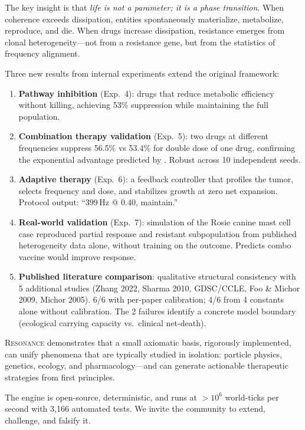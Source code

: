 \documentclass[11pt,a4paper]{article}
\begin{document}
The key insight is that \emph{life is not a parameter;
it is a phase transition}. When coherence exceeds
dissipation, entities spontaneously materialize, metabolize,
reproduce, and die. When drugs increase dissipation,
resistance emerges from clonal heterogeneity---not from
a resistance gene, but from the statistics of frequency
alignment.

Three new results from internal experiments extend the original framework:
\begin{enumerate}
  \item \textbf{Pathway inhibition} (Exp.~4): drugs that
        reduce metabolic efficiency without killing,
        achieving 53\% suppression while maintaining
        the full population.
  \item \textbf{Combination therapy validation} (Exp.~5):
        two drugs at different frequencies suppress
        56.5\% vs 53.4\% for double dose of one drug,
        confirming the exponential advantage predicted by
        \citet{bozic2013evolutionary}. Robust across
        10 independent seeds.
  \item \textbf{Adaptive therapy} (Exp.~6): a feedback
        controller that profiles the tumor, selects
        frequency and dose, and stabilizes growth at
        zero net expansion. Protocol output:
        ``399\,Hz @ 0.40, maintain.''
  \item \textbf{Real-world validation} (Exp.~7): simulation
        of the Rosie canine mast cell case reproduced
        partial response and resistant subpopulation from
        published heterogeneity data alone, without training
        on the outcome. Predicts combo vaccine would improve
        response.
  \item \textbf{Published literature comparison}: qualitative
        structural consistency with 5 additional studies
        (Zhang 2022, Sharma 2010, GDSC/CCLE, Foo \& Michor 2009,
        Michor 2005). 6/6 with per-paper calibration;
        4/6 from 4 constants alone without calibration.
        The 2 failures identify a concrete model boundary
        (ecological carrying capacity vs.\ clinical net-death).
\end{enumerate}

\textsc{Resonance} demonstrates that a small axiomatic
basis, rigorously implemented, can unify phenomena that
are typically studied in isolation: particle physics,
genetics, ecology, and pharmacology---and can generate
actionable therapeutic strategies from first principles.

The engine is open-source, deterministic, and runs at
$>10^6$ world-ticks per second with 3{,}166 automated tests.
We invite the community to extend, challenge, and falsify it.
\end{document}
